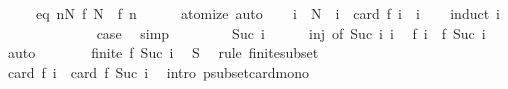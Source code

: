 \begin{isabellebody}
\ \ \ \ \ eq{\isacharcolon}{\kern0pt}\ {\isachardoublequoteopen}{\isasymforall}n{\isasymge}N{\isachardot}{\kern0pt}\ f\ N\ {\isacharequal}{\kern0pt}\ f\ n{\isachardoublequoteclose}\isanewline
\ \ \ \ \isamarkupfalse%
\ atomize\ auto\isanewline
\ \ \isamarkupfalse%
\ {\isachardoublequoteopen}i\ {\isasymle}\ N\ {\isasymLongrightarrow}\ i\ {\isasymle}\ card\ {\isacharparenleft}{\kern0pt}f\ i{\isacharparenright}{\kern0pt}{\isachardoublequoteclose}\ \ i\isanewline
\ \ \isamarkupfalse%
\ {\isacharparenleft}{\kern0pt}induct\ i{\isacharparenright}{\kern0pt}\isanewline
\ \ \ \ \isamarkupfalse%
\ {}\isanewline
\ \ \ \ \isamarkupfalse%
\ \isamarkupfalse%
\ {\isacharquery}{\kern0pt}case\ \isamarkupfalse%
\ simp\isanewline
\ \ \isamarkupfalse%
\isanewline
\ \ \ \ \isamarkupfalse%
\ {\isacharparenleft}{\kern0pt}Suc\ i{\isacharparenright}{\kern0pt}\isanewline
\ \ \ \ \isamarkupfalse%
\ inj\ {\isacharbrackleft}{\kern0pt}of\ {\isachardoublequoteopen}Suc\ i{\isachardoublequoteclose}\ i{\isacharbrackright}{\kern0pt}\ \isamarkupfalse%
\ {\isachardoublequoteopen}{\isacharparenleft}{\kern0pt}f\ i{\isacharparenright}{\kern0pt}\ {\isasymsubset}\ {\isacharparenleft}{\kern0pt}f\ {\isacharparenleft}{\kern0pt}Suc\ i{\isacharparenright}{\kern0pt}{\isacharparenright}{\kern0pt}{\isachardoublequoteclose}\ \isamarkupfalse%
\ auto\isanewline
\ \ \ \ \isamarkupfalse%
\ \isamarkupfalse%
\ {\isachardoublequoteopen}finite\ {\isacharparenleft}{\kern0pt}f\ {\isacharparenleft}{\kern0pt}Suc\ i{\isacharparenright}{\kern0pt}{\isacharparenright}{\kern0pt}{\isachardoublequoteclose}\ \isamarkupfalse%
\ S\ \isamarkupfalse%
\ {\isacharparenleft}{\kern0pt}rule\ finite{\isacharunderscore}{\kern0pt}subset{\isacharparenright}{\kern0pt}\isanewline
\ \ \ \ \isamarkupfalse%
\ \isamarkupfalse%
\ {\isachardoublequoteopen}card\ {\isacharparenleft}{\kern0pt}f\ i{\isacharparenright}{\kern0pt}\ {\isacharless}{\kern0pt}\ card\ {\isacharparenleft}{\kern0pt}f\ {\isacharparenleft}{\kern0pt}Suc\ i{\isacharparenright}{\kern0pt}{\isacharparenright}{\kern0pt}{\isachardoublequoteclose}\ \isamarkupfalse%
\ {\isacharparenleft}{\kern0pt}intro\ psubset{\isacharunderscore}{\kern0pt}card{\isacharunderscore}{\kern0pt}mono{\isacharparenright}{\kern0pt}\isanewline
\ \ \ \ \isamarkupfalse%

\end{isabellebody}
